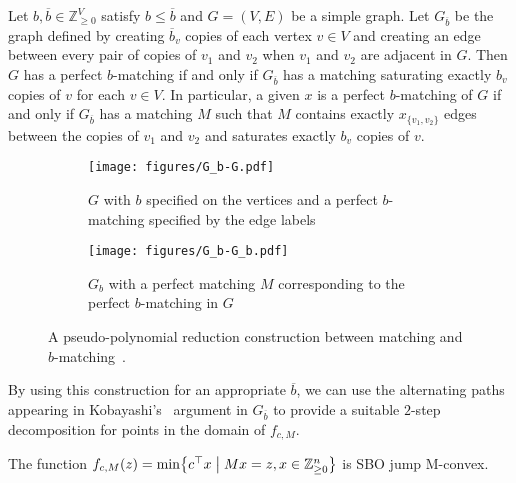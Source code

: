 \documentclass[a4paper,UKenglish,cleveref,thm-restate]{lipics-v2021}
\newcommand{\Z}{\mathbb Z}
\begin{document}
\begin{proposition}
    Let $b,\overline b\in\mathbb Z_{\ge0}^V$ satisfy $b\le\overline b$ and $G=(V,E)$ be a simple graph. Let $G_{\overline b}$ be the graph defined by creating $\overline b_v$ copies of each vertex $v\in V$ and creating an edge between every pair of copies of $v_1$ and $v_2$ when $v_1$ and $v_2$ are adjacent in $G$. Then $G$ has a perfect $b$-matching if and only if $G_{\overline b}$ has a matching saturating exactly $b_v$ copies of $v$ for each $v\in V$. In particular, a given $x$ is a perfect $b$-matching of $G$ if and only if $G_{\overline b}$ has a matching $M$ such that $M$ contains exactly $x_{\{v_1,v_2\}}$ edges between the copies of $v_1$ and $v_2$ and saturates exactly $b_v$ copies of $v$.
    \label{prop:gb}
\end{proposition}

\begin{figure}
    \begin{subfigure}{0.45\textwidth}
        \centering
        \texttt{[image: figures/G\_b-G.pdf]}
        \caption{$G$ with $b$ specified on the vertices and a perfect $b$-matching specified by the edge labels}
    \end{subfigure}
    \hspace{0.05\textwidth}
    \begin{subfigure}{0.45\textwidth}
        \centering
        \texttt{[image: figures/G\_b-G\_b.pdf]}
        \caption{$G_b$ with a perfect matching $M$ corresponding to the perfect $b$-matching in $G$}
    \end{subfigure}
    \caption{A pseudo-polynomial reduction construction between matching and $b$-matching~\cite{schrijver2003combinatorial}.}
    \label{fig:G_b}
\end{figure}

By using this construction for an appropriate $\overline b$, we can use the alternating paths appearing in Kobayashi's~\cite{DBLP:conf/ipco/Kobayashi23} argument in $G_{\overline b}$ to provide a suitable $2$-step decomposition for points in the domain of $f_{c,M}$.

\begin{proposition}
    The function $f_{c,M}(z)=\min\bigl\{c^\top x\bigm\vert Mx=z,x\in\Z_{\ge0}^n\bigr\}$ is SBO jump M-convex.
    \label{prop:b-matching-is-sbo-jump-m-convex}
\end{proposition}
\end{document}
